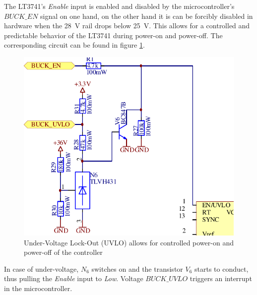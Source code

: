 The   LT3741's   \emph{Enable}   input   is   enabled   and   disabled   by  the
microcontroller's  $BUCK\_EN$ signal on one hand, on the other hand it is can be
forcibly  disabled  in  hardware  when  the  \SI{28}{\volt}  rail   drops  below
\SI{25}{\volt}. This  allows  for  a  controlled and predictable behavior of the
LT3741 during power-on  and power-off. The corresponding circuit can be found in
figure \ref{fig:circuit:uvlo}.

\begin{figure}[th!]
    \center
    \includegraphics[width=.6\textwidth]{images/circuit/uvlo.pdf}
    \caption{Under-Voltage Lock-Out (UVLO) allows for controlled power-on and power-off of the controller}
    \label{fig:circuit:uvlo}
\end{figure}

In case of under-voltage, $N_6$ switches  on  and the transistor $V_6$ starts to
conduct,  thus  pulling  the  \emph{Enable}   input   to   \emph{Low}.   Voltage
$BUCK\_UVLO$ triggers an interrupt in the microcontroller.

